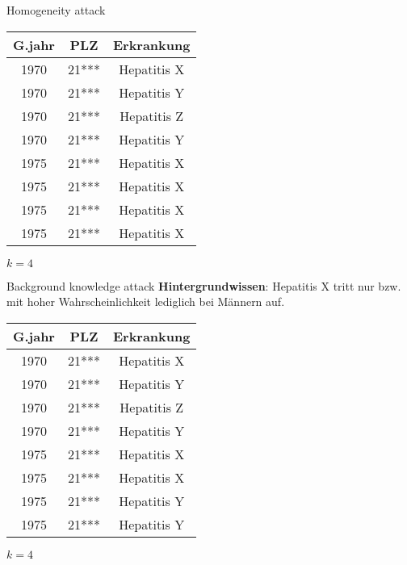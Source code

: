%
%


\begin{frame} {Homogeneity attack}
	\centering
	\small
	\begin{tabular}{|c|c|c|}
	\hline \textbf{G.jahr} & \textbf{PLZ} & \textbf{Erkrankung} \\
	\hline 1970 & 21*** & Hepatitis X \\ 
	 1970 & 21*** & Hepatitis Y \\ 
	 1970 & 21*** & Hepatitis Z \\ 
	 1970 & 21*** & Hepatitis Y \\ 
	\hline 1975 & 21*** & \cellcolor{svsrot}Hepatitis X \\ 
	 1975 & 21*** & \cellcolor{svsrot}Hepatitis X \\ 
	 1975 & 21*** & \cellcolor{svsrot}Hepatitis X \\ 
	 1975 & 21*** & \cellcolor{svsrot}Hepatitis X \\
	\hline 
	\end{tabular}
	\vspace{0.3cm}

	\(k = 4\)
\end{frame}


\begin{frame} {Background knowledge attack}
	\centering
	\textbf{Hintergrundwissen}: Hepatitis X tritt nur bzw. mit hoher Wahrscheinlichkeit lediglich bei Männern auf.
	\vspace{0.5cm}

	\small
	\begin{tabular}{|c|c|c|}
	\hline \textbf{G.jahr} & \textbf{PLZ} & \textbf{Erkrankung} \\
	\hline 1970 & 21*** & Hepatitis X \\ 
	 1970 & 21*** & Hepatitis Y \\ 
	 1970 & 21*** & Hepatitis Z \\ 
	 1970 & 21*** & Hepatitis Y \\ 
	\hline 1975 & 21*** & \cellcolor{svshellblau1}Hepatitis X \\ 
	 1975 & 21*** & \cellcolor{svshellblau1} Hepatitis X \\ 
	 1975 & 21*** & \cellcolor{svsrot}Hepatitis Y \\ 
	 1975 & 21*** & \cellcolor{svsrot}Hepatitis Y \\
	\hline 
	\end{tabular}
	\vspace{0.3cm}

	\(k = 4\)	
\end{frame}
